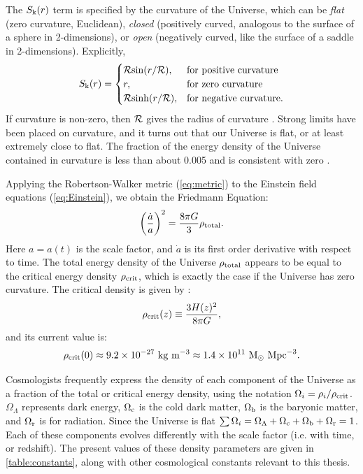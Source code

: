 The $S_{\rm k}(r)$ term is specified by the curvature of the Universe, which can be {\it flat} (zero curvature, Euclidean), {\it closed} (positively curved, analogous to the surface of a sphere in 2-dimensions), or {\it open} (negatively curved, like the surface of a saddle in 2-dimensions). Explicitly,
\begin{equation}
S_{\rm k}(r) = 
    \begin{cases}
        {\cal R}{\rm sin}(r/{\cal R}), & \text{for positive curvature} \\
        r,              & \text{for zero curvature} \\
        {\cal R}{\rm sinh}(r/{\cal R}), & \text{for negative curvature.}
    \end{cases}
\end{equation}
If curvature is non-zero, then $\cal R$ gives the radius of curvature \citep{RydenText}. Strong limits have been placed on curvature, and it turns out that our Universe is flat, or at least extremely close to flat. The fraction of the energy density of the Universe contained in curvature is less than about 0.005 and is consistent with zero \citep{PlanckXIII_15}.

Applying the Robertson-Walker metric (\autoref{eq:metric}) to the Einstein field equations (\autoref{eq:Einstein}), we obtain the Friedmann Equation:
\begin{equation}
\left( \frac{\dot a}{a} \right)^2 = \frac{8\pi G}{3} \rho_{\rm total}.
\end{equation}
Here $a=a(t)$ is the scale factor, and $\dot a$ is its first order derivative with respect to time. The total energy density of the Universe $\rho_{\rm total}$ appears to be equal to the critical energy density $\rho_{\rm crit}$, which is exactly the case if the Universe has zero curvature. The critical density is given by \citep{RydenText}:
\begin{equation}
\rho_{\rm crit}(z) \equiv \frac{3H(z)^2}{8\pi G},
\end{equation}
and its current value is:
\begin{equation}
\rho_{\rm crit}(0) \approx 9.2 \times 10^{-27}\ {\rm kg}\ {\rm m}^{-3} \approx 1.4 \times 10^{11}\ {\rm M}_{\odot}\ {\rm Mpc}^{-3}.
\end{equation}

Cosmologists frequently express the density of each component of the Universe as a fraction of the total or critical energy density, using the notation $\Omega_i = \rho_i / \rho_{\rm crit}$. $\Omega_{\Lambda}$ represents dark energy, $\Omega_{\rm c}$ is the cold dark matter, $\Omega_{\rm b}$ is the baryonic matter, and $\Omega_{\rm r}$ is for radiation. Since the Universe is flat $\sum \Omega_i = \Omega_{\Lambda} + \Omega_{\rm c} + \Omega_{\rm b} + \Omega_{\rm r} =1$. Each of these components evolves differently with the scale factor (i.e. with time, or redshift). The present values of these density parameters are given in \autoref{table:constants}, along with other cosmological constants relevant to this thesis.


